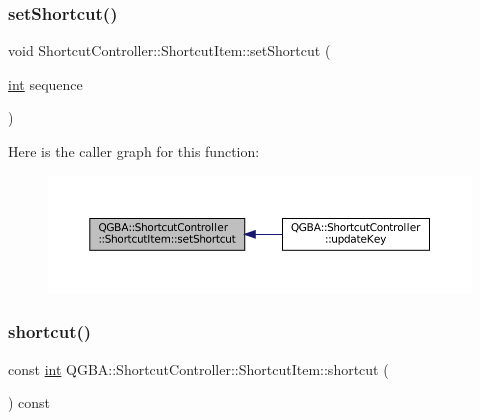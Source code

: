 \subsubsection{\texorpdfstring{set\+Shortcut()}{setShortcut()}}
{\footnotesize\ttfamily void Shortcut\+Controller\+::\+Shortcut\+Item\+::set\+Shortcut (\begin{DoxyParamCaption}\item[{\mbox{\hyperlink{ioapi_8h_a787fa3cf048117ba7123753c1e74fcd6}{int}}}]{sequence }\end{DoxyParamCaption})}

Here is the caller graph for this function\+:
\nopagebreak
\begin{figure}[H]
\begin{center}
\leavevmode
\includegraphics[width=350pt]{class_q_g_b_a_1_1_shortcut_controller_1_1_shortcut_item_a2fdd3769419d0f7c60ac9db85415a9dd_icgraph}
\end{center}
\end{figure}
\mbox{\label{class_q_g_b_a_1_1_shortcut_controller_1_1_shortcut_item_a9dad28d0bb9557439965aad43e19918b}} 
\subsubsection{\texorpdfstring{shortcut()}{shortcut()}}
{\footnotesize\ttfamily const \mbox{\hyperlink{ioapi_8h_a787fa3cf048117ba7123753c1e74fcd6}{int}} Q\+G\+B\+A\+::\+Shortcut\+Controller\+::\+Shortcut\+Item\+::shortcut (\begin{DoxyParamCaption}{ }\end{DoxyParamCaption}) const\hspace{0.3cm}{\ttfamily [inline]}}


